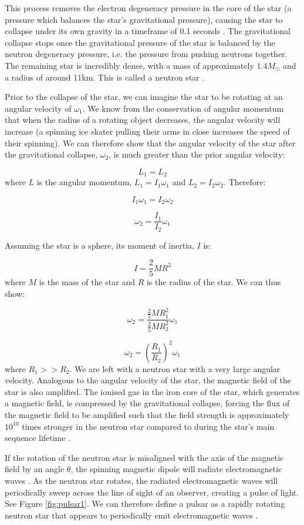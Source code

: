 \documentclass{article}
\begin{document}
This process removes the electron degeneracy pressure in the core of the star (a pressure which balances the star's gravitational pressure), causing the star to collapse under its own gravity in a timeframe of 0.1 seconds \autocite{maoz}. The gravitational collapse stops once the gravitational pressure of the star is balanced by the neutron degeneracy pressure, i.e. the pressure from pushing neutrons together. The remaining star is incredibly dense, with a mass of approximately $1.4M_{\odot}$ and a radius of around 11km. This is called a neutron star \autocite{maoz}.

Prior to the collapse of the star, we can imagine the star to be rotating at an angular velocity of $\omega_1$. We know from the conservation of angular momentum that when the radius of a rotating object decreases, the angular velocity will increase (a spinning ice skater pulling their arms in close increases the speed of their spinning). We can therefore show that the angular velocity of the star after the gravitational collapse, $\omega_2$, is much greater than the prior angular velocity:

$$L_1 = L_2$$ where $L$ is the angular momentum, $L_1=I_1\omega_1$ and $L_2=I_2\omega_2$. Therefore:

$$ I_1 \omega_1 = I_2 \omega_2 $$

$$\omega_2 = \frac{I_1}{I_2}\omega_1$$

Assuming the star is a sphere, its moment of inertia, $I$ is:

$$I = \frac{2}{5}MR^2$$ where $M$ is the mass of the star and $R$ is the radius of the star. We can thus show:

$$\omega_2 = \frac{\frac{2}{5}MR_1^2}{\frac{2}{5}MR_2^2}\omega_1$$

$$\omega_2 = \left(\frac{R_1}{R_2}\right)^2\omega_1$$ where $R_1 >> R_2$. We are left with a neutron star with a very large angular velocity. Analogous to the angular velocity of the star, the magnetic field of the star is also amplified. The ionised gas in the iron core of the star, which generates a magnetic field, is compressed by the gravitational collapse, forcing the flux of the magnetic field to be amplified such that the field strength is approximately $10^{10}$ times stronger in the neutron star compared to during the star's main sequence lifetime \autocite{maoz}.

If the rotation of the neutron star is misaligned with the axis of the magnetic field by an angle $\theta$, the spinning magnetic dipole will radiate electromagnetic waves \autocite{maoz}. As the neutron star rotates, the radiated electromagnetic waves will periodically sweep across the line of sight of an observer, creating a pulse of light. See Figure \ref{fig:pulsar1}. We can therefore define a pulsar as a rapidly rotating neutron star that appears to periodically emit electromagnetic waves \autocite{maoz,lorimer,swainston}.
\end{document}
